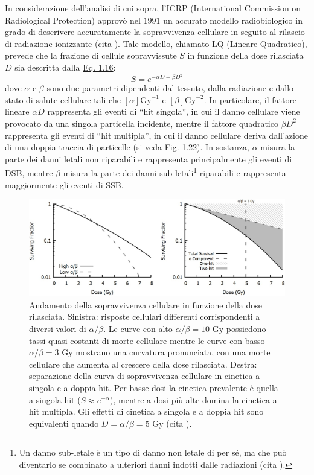 \documentclass[12pt,a4paper,twoside]{report}
\begin{document}
	In considerazione dell'analisi di cui sopra, l'ICRP (International Commission on Radiological Protection) approvò nel $1991$ un accurato modello radiobiologico in grado di descrivere accuratamente la sopravvivenza cellulare in seguito al rilascio di radiazione ionizzante (cita
	). Tale modello, chiamato LQ (Lineare Quadratico), prevede che la frazione di cellule sopravvissute $S$ in funzione della dose rilasciata $D$ sia descritta dalla \hyperref[eq:survival2]{Eq. 1.16}:
	\begin{equation}
		S=e^{-\alpha D-\beta D^2}
		\label{eq:survival2}
	\end{equation}
	dove $\alpha$ e $\beta$ sono due parametri dipendenti dal tessuto, dalla radiazione e dallo stato di salute cellulare tali che $\left[\alpha\right]\mbox{Gy}^{-1}$ e $\left[\beta\right]\mbox{Gy}^{-2}$. In particolare, il fattore lineare $\alpha D$ rappresenta gli eventi di ``hit singola'', in cui il danno cellulare viene provocato da una singola particella incidente, mentre il fattore quadratico $\beta D^2$ rappresenta gli eventi di ``hit multipla'', in cui il danno cellulare deriva dall'azione di una doppia traccia di particelle (si veda \hyperref[fig:survival_cell]{Fig. 1.22}). In sostanza, $\alpha$ misura la parte dei danni letali non riparabili e rappresenta principalmente gli eventi di DSB, mentre $\beta$ misura la parte dei danni sub-letali\footnote{Un danno sub-letale è un tipo di danno non letale di per sé, ma che può diventarlo se combinato a ulteriori danni indotti dalle radiazioni (cita
		).} riparabili e rappresenta maggiormente gli eventi di SSB.
	\begin{figure}[H]
		\centering
		\includegraphics[width=0.9\linewidth]{survival_cell.jpg}
		\caption{Andamento della sopravvivenza cellulare in funzione della dose rilasciata. Sinistra: risposte cellulari differenti corrispondenti a diversi valori di $\alpha/\beta$. Le curve con alto $\alpha/\beta=10\mbox{ Gy}$ possiedono tassi quasi costanti di morte cellulare mentre le curve con basso $\alpha/\beta=3\mbox{ Gy}$ mostrano una curvatura pronunciata, con una morte cellulare che aumenta al crescere della dose rilasciata. Destra: separazione della curva di sopravvivenza cellulare in cinetica a singola e a doppia hit. Per basse dosi la cinetica prevalente è quella a singola hit ($S\approx e^{-\alpha}$), mentre a dosi più alte domina la cinetica a hit multipla. Gli effetti di cinetica a singola e a doppia hit sono equivalenti quando $D=\alpha/\beta=5\mbox{ Gy}$ (cita
			).}
		\label{fig:survival_cell}
	\end{figure}
\end{document}
